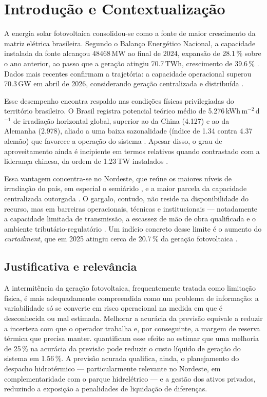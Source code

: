 \newpage
\section{Introdução e Contextualização}

A energia solar fotovoltaica consolidou-se como a fonte de maior crescimento da matriz elétrica brasileira. Segundo o Balanço Energético Nacional, a capacidade instalada da fonte alcançou 48468\,MW ao final de 2024, expansão de 28.1\,\% sobre o ano anterior, ao passo que a geração atingiu 70.7\,TWh, crescimento de 39.6\,\% \citep{epe2025}. Dados mais recentes confirmam a trajetória: a capacidade operacional superou 70.3\,GW em abril de 2026, considerando geração centralizada e distribuída \citep{absolar2026}.

Esse desempenho encontra respaldo nas condições físicas privilegiadas do território brasileiro. O Brasil registra potencial teórico médio de 5.276\,kWh\,m$^{-2}$\,d$^{-1}$ de irradiação horizontal global, superior ao da China (4.127) e ao da Alemanha (2.978), aliado a uma baixa sazonalidade (índice de 1.34 contra 4.37 alemão) que favorece a operação do sistema \citep{suri2020}. Apesar disso, o grau de aproveitamento ainda é incipiente em termos relativos quando contrastado com a liderança chinesa, da ordem de 1.23\,TW instalados \citep{nea2026}.

Essa vantagem concentra-se no Nordeste, que reúne os maiores níveis de irradiação do país, em especial o semiárido \citep{pereira2017}, e a maior parcela da capacidade centralizada outorgada \citep{absolar2026}. O gargalo, contudo, não reside na disponibilidade do recurso, mas em barreiras operacionais, técnicas e institucionais — notadamente a capacidade limitada de transmissão, a escassez de mão de obra qualificada e o ambiente tributário-regulatório \citep{fratea2017,queiroz2020}. Um indício concreto desse limite é o aumento do \textit{curtailment}, que em 2025 atingiu cerca de 20.7\,\% da geração fotovoltaica \citep{absolar2026}.

\subsection{Justificativa e relevância}

A intermitência da geração fotovoltaica, frequentemente tratada como limitação física, é mais adequadamente compreendida como um problema de informação: a variabilidade só se converte em risco operacional na medida em que é desconhecida ou mal estimada. Melhorar a acurácia da previsão equivale a reduzir a incerteza com que o operador trabalha e, por conseguinte, a margem de reserva térmica que precisa manter. \citet{tian2023} quantificam esse efeito ao estimar que uma melhoria de 25\,\% na acurácia da previsão pode reduzir o custo líquido de geração do sistema em 1.56\,\%. A previsão acurada qualifica, ainda, o planejamento do despacho hidrotérmico — particularmente relevante no Nordeste, em complementaridade com o parque hidrelétrico — e a gestão dos ativos privados, reduzindo a exposição a penalidades de liquidação de diferenças.

